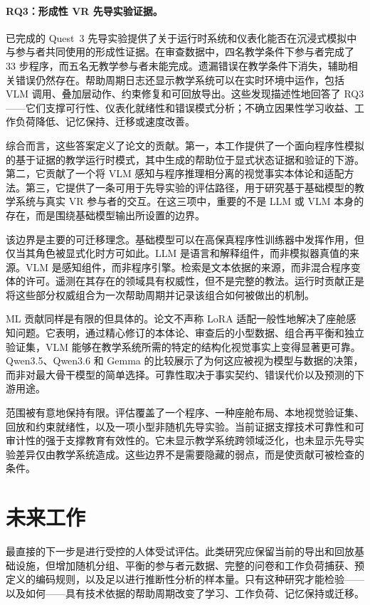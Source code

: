 \paragraph{RQ3：形成性 VR 先导实验证据。}已完成的 Quest~3 先导实验提供了关于运行时系统和仪表化能否在沉浸式模拟中与参与者共同使用的形成性证据。在审查数据中，四名教学条件下参与者完成了 33 步程序，而五名无教学参与者未能完成。遗漏错误在教学条件下消失，辅助相关错误仍然存在。帮助周期日志还显示教学系统可以在实时环境中运作，包括 VLM 调用、叠加层动作、约束修复和可回放导出。这些发现描述性地回答了 RQ3——它们支撑可行性、仪表化就绪性和错误模式分析；不确立因果性学习收益、工作负荷降低、记忆保持、迁移或速度改善。

综合而言，这些答案定义了论文的贡献。第一，本工作提供了一个面向程序性模拟的基于证据的教学运行时模式，其中生成的帮助位于显式状态证据和验证的下游。第二，它贡献了一个将 VLM 感知与程序推理相分离的视觉事实本体论和适配方法。第三，它提供了一条可用于先导实验的评估路径，用于研究基于基础模型的教学系统与真实 VR 参与者的交互。在这三项中，重要的不是 LLM 或 VLM 本身的存在，而是围绕基础模型输出所设置的边界。

该边界是主要的可迁移理念。基础模型可以在高保真程序性训练器中发挥作用，但仅当其角色被显式化时方可如此。LLM 是语言和解释组件，而非模拟器真值的来源。VLM 是感知组件，而非程序引擎。检索是文本依据的来源，而非混合程序变体的许可。遥测在其存在的领域具有权威性，但不是完整的教法。运行时贡献正是将这些部分权威组合为一次帮助周期并记录该组合如何被做出的机制。

ML 贡献同样是有限的但具体的。论文不声称 LoRA 适配一般性地解决了座舱感知问题。它表明，通过精心修订的本体论、审查后的小型数据、组合再平衡和独立验证集，VLM 能够在教学系统所需的特定的结构化视觉事实上变得显著更可靠。Qwen3.5、Qwen3.6 和 Gemma 的比较展示了为何这应被视为模型与数据的决策，而非对最大骨干模型的简单选择。可靠性取决于事实契约、错误代价以及预测的下游用途。

范围被有意地保持有限。评估覆盖了一个程序、一种座舱布局、本地视觉验证集、回放和约束就绪性，以及一项小型非随机先导实验。当前证据支撑技术可靠性和可审计性的强于支撑教育有效性的。它未显示教学系统跨领域泛化，也未显示先导实验差异仅由教学系统造成。这些边界不是需要隐藏的弱点，而是使贡献可被检查的条件。

\section{未来工作}\label{sec:conc-future}

最直接的下一步是进行受控的人体受试评估。此类研究应保留当前的导出和回放基础设施，但增加随机分组、平衡的参与者元数据、完整的问卷和工作负荷捕获、预定义的编码规则，以及足以进行推断性分析的样本量。只有这种研究才能检验——以及如何——具有技术依据的帮助周期改变了学习、工作负荷、记忆保持或迁移。

